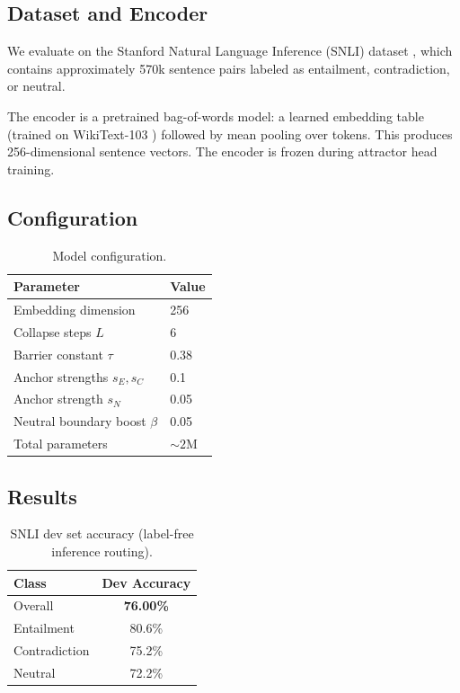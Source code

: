 \documentclass[11pt]{article}
\newcommand{\barrier}{\tau}
\begin{document}
\subsection{Dataset and Encoder}

We evaluate on the Stanford Natural Language Inference (SNLI) dataset
\citep{bowman2015snli}, which contains approximately 570k sentence pairs
labeled as entailment, contradiction, or neutral.

The encoder is a pretrained bag-of-words model: a learned embedding table
(trained on WikiText-103 \citep{merity2016wikitext}) followed by mean
pooling over tokens. This produces 256-dimensional sentence vectors.
The encoder is frozen during attractor head training.

\subsection{Configuration}

\begin{table}[ht]
\centering
\begin{tabular}{@{}ll@{}}
\toprule
Parameter & Value \\
\midrule
Embedding dimension & 256 \\
Collapse steps $L$ & 6 \\
Barrier constant $\barrier$ & 0.38 \\
Anchor strengths $s_E, s_C$ & 0.1 \\
Anchor strength $s_N$ & 0.05 \\
Neutral boundary boost $\beta$ & 0.05 \\
Total parameters & ${\sim}2$M \\
\bottomrule
\end{tabular}
\caption{Model configuration.}
\label{tab:config}
\end{table}

\subsection{Results}

\begin{table}[ht]
\centering
\begin{tabular}{@{}lc@{}}
\toprule
Class & Dev Accuracy \\
\midrule
Overall & \textbf{76.00\%} \\
Entailment & 80.6\% \\
Contradiction & 75.2\% \\
Neutral & 72.2\% \\
\bottomrule
\end{tabular}
\caption{SNLI dev set accuracy (label-free inference routing).}
\label{tab:results}
\end{table}
\end{document}
